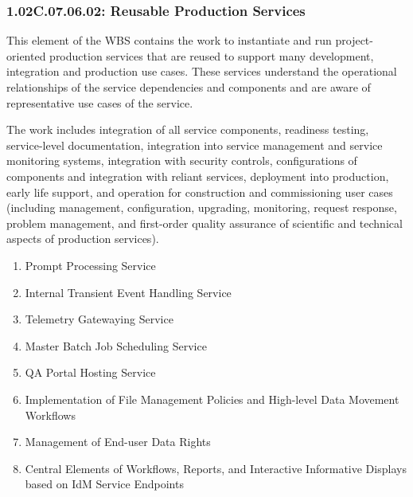 \subsubsection*{1.02C.07.06.02: Reusable Production Services}

This element of the WBS contains the work to instantiate and run project-oriented production services that are reused to support many development, integration and production use cases.
These services understand the operational relationships of the service dependencies and components and are aware of representative use cases of the service.

The work includes integration of all service components, readiness testing, service-level documentation, integration into service management and service monitoring systems, integration with security controls, configurations of components and integration with reliant services, deployment into production, early life support, and operation for construction and commissioning user cases (including management, configuration, upgrading, monitoring, request response, problem management, and first-order quality assurance of scientific and technical aspects of production services).

\begin{enumerate}

  \item{Prompt Processing Service}
  \item{Internal Transient Event Handling Service}
  \item{Telemetry Gatewaying Service}
  \item{Master Batch Job Scheduling Service}
  \item{QA Portal Hosting Service}
  \item{Implementation of File Management Policies and High-level Data Movement Workflows}
  \item{Management of End-user Data Rights}
  \item{Central Elements of Workflows, Reports, and Interactive Informative Displays based on IdM Service Endpoints}

\end{enumerate}

